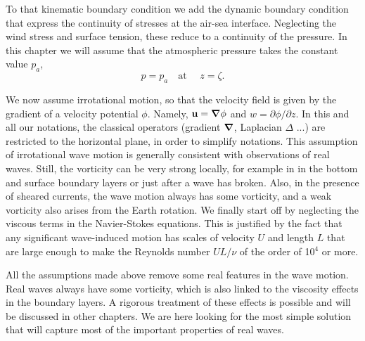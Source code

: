 To that kinematic boundary condition we add the dynamic boundary condition that express the continuity of 
stresses at the air-sea interface. Neglecting the wind stress and surface tension, these reduce to a continuity of 
the pressure. In this chapter we will assume that the atmospheric pressure takes the constant value  $p_a$,
\begin{equation}
    p=p_a\quad \mbox{at\ }\quad z=\zeta.
\end{equation}

We now assume irrotational motion, so that the velocity field 
is given by the gradient of a velocity potential 
$\phi$. Namely, $ {\mathbf u} = \mbox{\boldmath $\nabla$} \phi$ and $w={\partial
\phi}/{\partial z}$. In this and all our notations, the classical operators  (gradient
$\mbox{\boldmath $\nabla$}$, Laplacian $\Delta$ ...) are restricted to the horizontal 
plane, in order to simplify notations. This assumption of irrotational wave motion
is generally consistent with observations of real waves. Still, the vorticity can be 
very strong locally, for example in in the bottom and surface boundary layers
or just after a wave has broken. Also, in the presence of sheared currents, the wave motion always has 
some vorticity, and a weak vorticity also arises from the Earth rotation. 
We finally start off by neglecting the viscous terms in the Navier-Stokes equations. This is justified by the 
fact that any significant 
wave-induced motion has scales of velocity $U$ and length $L$ that are large enough to 
make the Reynolds number $UL/\nu$ of the order of  10$^4$ or more.

All the assumptions made above remove some real features in the wave motion. 
Real waves always have some vorticity, which is also linked to the viscosity 
effects in the boundary layers. A rigorous treatment of these effects is possible 
and will be discussed in other chapters. We are here looking for the most 
simple solution that will capture most of the important properties of real waves. 


